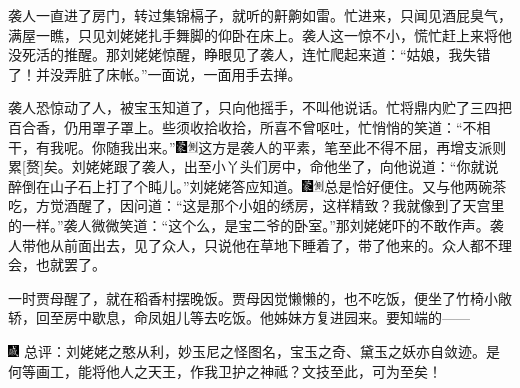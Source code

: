 袭人一直进了房门，转过集锦槅子，就听的鼾齁如雷。忙进来，只闻见酒屁臭气，满屋一瞧，只见刘姥姥扎手舞脚的仰卧在床上。袭人这一惊不小，慌忙赶上来将他没死活的推醒。那刘姥姥惊醒，睁眼见了袭人，连忙爬起来道：``姑娘，我失错了！并没弄脏了床帐。''一面说，一面用手去掸。

袭人恐惊动了人，被宝玉知道了，只向他摇手，不叫他说话。忙将鼎内贮了三四把百合香，仍用罩子罩上。些须收拾收拾，所喜不曾呕吐，忙悄悄的笑道：``不相干，有我呢。你随我出来。''{\includegraphics[width=3mm]{../Images/00006}\includegraphics[width=3mm]{../Images/00011}\footnotesize \kaishu 这方是袭人的平素，笔至此不得不屈，再增支派则累{[}赘{]}矣。}刘姥姥跟了袭人，出至小丫头们房中，命他坐了，向他说道：``你就说醉倒在山子石上打了个盹儿。''刘姥姥答应知道。{\includegraphics[width=3mm]{../Images/00006}\includegraphics[width=3mm]{../Images/00011}\footnotesize \kaishu 总是恰好便住。}又与他两碗茶吃，方觉酒醒了，因问道：``这是那个小姐的绣房，这样精致？我就像到了天宫里的一样。''袭人微微笑道：``这个么，是宝二爷的卧室。''那刘姥姥吓的不敢作声。袭人带他从前面出去，见了众人，只说他在草地下睡着了，带了他来的。众人都不理会，也就罢了。

一时贾母醒了，就在稻香村摆晚饭。贾母因觉懒懒的，也不吃饭，便坐了竹椅小敞轿，回至房中歇息，命凤姐儿等去吃饭。他姊妹方复进园来。要知端的------

{\includegraphics[width=3mm]{../Images/00005} \kaishu 总评：刘姥姥之憨从利，妙玉尼之怪图名，宝玉之奇、黛玉之妖亦自敛迹。是何等画工，能将他人之天王，作我卫护之神祗？文技至此，可为至矣！}
